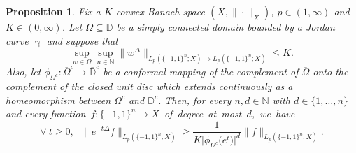 \documentclass[11pt,reqno]{amsart}
\renewcommand{\leq}{\leqslant}
\renewcommand{\geq}{\geqslant}
\renewcommand{\gamma}{\upgamma}
\newcommand{\1}{\mathbf 1}
\newtheorem{proposition}[theorem]{Proposition}
\theoremstyle{remark}
\newcommand{\N}{\mathbb N}
\renewcommand{\gamma}{\upgamma}
\newcommand{\mb}{\mathbb}
\begin{document}
\begin{proposition} \label{prop:reverseheatcrucial}
Fix a $K$-convex Banach space $(X,\|\cdot\|_X)$, $p\in(1,\infty)$ and $K\in(0,\infty)$. Let $\Omega\subseteq\mb{D}$ be a simply connected domain bounded by a Jordan curve $\gamma$ and suppose that
\begin{equation} \label{eq:assumppropKconv0}
\sup_{w\in\Omega} \sup_{n\in\N}\|w^\Delta\|_{{L_p(\{-1,1\}^n;X)}\to {L_p(\{-1,1\}^n;X)}} \leq K.
\end{equation}
Also, let $\phi_{\Omega^c}:\overline{\Omega}^c\to\overline{\mb{D}}^c$ be a conformal mapping of the complement of $\overline{\Omega}$ onto the complement of the closed unit disc which extends continuously as a homeomorphism between $\Omega^c$ and $\mb{D}^c$. Then, for every $n,d\in\N$ with $d\in\{1,\ldots,n\}$ and every function\mbox{ $f:\{-1,1\}^n\to X$ of degree at most $d$, we have}
\begin{equation} \label{eq:reverseheatconformal}
\forall \ t\geq0, \ \ \ \|e^{-t\Delta}f\|_{L_p(\{-1,1\}^n;X)} \geq \frac{1}{K\big|\phi_{\Omega^c}\big(e^{t}\big)\big|^d} \|f\|_{L_p(\{-1,1\}^n;X)}.
\end{equation}
\end{proposition}
\end{document}
